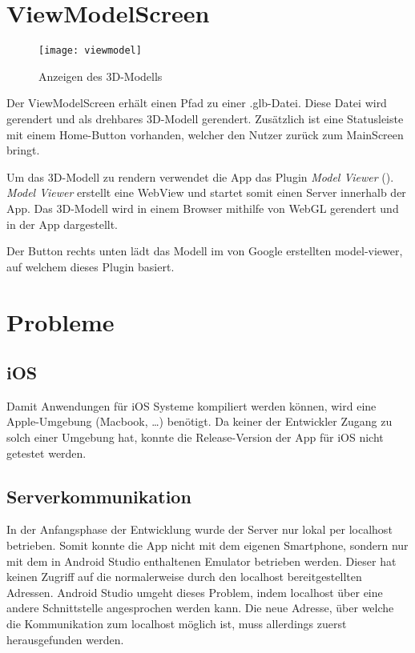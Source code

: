 \clearpage
\section{ViewModelScreen}
\begin{figure}[htpb]
    \centering
    \texttt{[image: viewmodel]}
    \caption{Anzeigen des 3D-Modells}
    \label{img:viewmodel}
\end{figure}

Der ViewModelScreen erhält einen Pfad zu einer .glb-Datei. Diese Datei wird gerendert und als drehbares 3D-Modell gerendert. Zusätzlich ist eine Statusleiste mit einem Home-Button 
vorhanden, welcher den Nutzer zurück zum MainScreen bringt. 

Um das 3D-Modell zu rendern verwendet die App das Plugin \textit{Model Viewer} (\cite{misc:modelviewer}). \textit{Model Viewer} erstellt eine WebView und startet somit einen Server 
innerhalb der App. Das 3D-Modell wird in einem Browser mithilfe von WebGL gerendert und in der App dargestellt.

Der Button rechts unten lädt das Modell im von Google erstellten model-viewer, auf welchem dieses Plugin basiert.

\pagebreak
\section{Probleme}

\subsection{iOS}

Damit Anwendungen für iOS Systeme kompiliert werden können, wird eine Apple-Umgebung (Macbook, \dots) benötigt. Da keiner der Entwickler Zugang zu solch einer Umgebung hat, konnte die 
Release-Version der App für iOS nicht getestet werden.

\subsection{Serverkommunikation}

In der Anfangsphase der Entwicklung wurde der Server nur lokal per localhost betrieben. Somit konnte die App nicht mit dem eigenen Smartphone, sondern nur mit dem in Android Studio 
enthaltenen Emulator betrieben werden. Dieser hat keinen Zugriff auf die normalerweise durch den localhost bereitgestellten Adressen. Android Studio umgeht dieses Problem, indem 
localhost über eine andere Schnittstelle angesprochen werden kann. Die neue Adresse, über welche die Kommunikation zum localhost möglich ist, muss allerdings zuerst herausgefunden werden.

